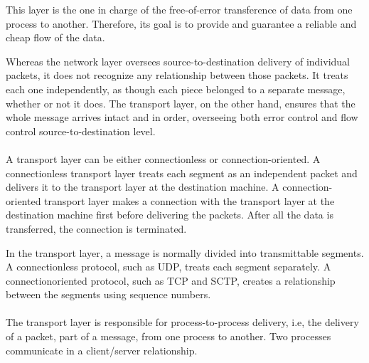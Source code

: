 %
%
%
%
%

This layer is the one in charge of the free-of-error transference of data from one process to another. Therefore, its goal is to provide and guarantee a reliable and cheap flow of the data. 

Whereas the network layer oversees source-to-destination delivery of individual packets, it does not recognize any relationship between those packets. It treats each one independently, as though each piece belonged to a separate message, whether or not it does. The transport layer, on the other hand, ensures that the whole message arrives intact and in order, overseeing both error control and flow control source-to-destination level. 

\paragraph{}

A transport layer can be either connectionless or connection-oriented. A connectionless transport layer treats each segment as an independent packet and delivers it to the transport layer at the destination machine. A connection-oriented transport layer makes a connection with the transport layer at the destination machine first before delivering the packets. After all the data is transferred, the connection is terminated.

In the transport layer, a message is normally divided into transmittable segments. A connectionless protocol, such as UDP, treats each segment separately. A connectionoriented protocol, such as TCP and SCTP, creates a relationship between the segments using sequence numbers.
\paragraph{}


The transport layer is responsible for process-to-process delivery, i.e, the delivery of a packet, part of a message, from one process to another. Two processes communicate in a client/server relationship. 

